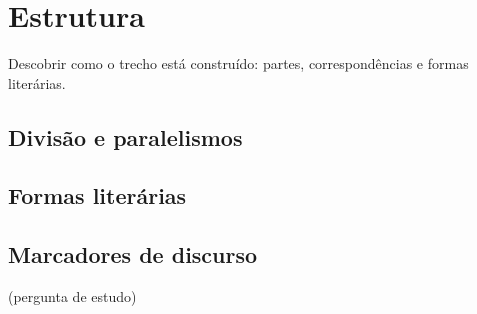 \chapter{Estrutura}\label{cap:estrutura}

\begin{objetivo}
Descobrir como o trecho está construído: partes, correspondências e formas literárias.
\end{objetivo}

\section{Divisão e paralelismos}

\section{Formas literárias}

\section{Marcadores de discurso}

\begin{pergunta}
(pergunta de estudo)
\end{pergunta}

